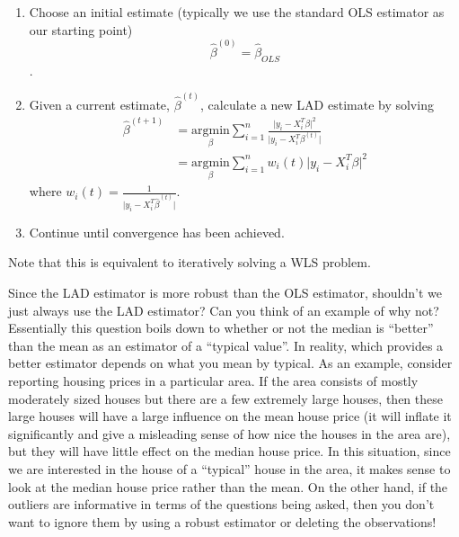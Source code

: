\begin{enumerate}
\item Choose an initial estimate (typically we use the standard OLS estimator as our starting point) $$\hat{\beta}^{(0)} = \hat{\beta}_{OLS}$$.
\item Given a current estimate, $\hat{\beta}^{(t)}$, calculate a new LAD estimate by solving
\begin{align*}
\hat{\beta}^{(t + 1)} & = \underset{\beta}{\text{argmin}} \sum_{i=1}^n \frac{\Big\vert y_i - X_i^T \beta \Big\vert^2}{\Big\vert y_i - X_i^T \beta^{(t)} \Big\vert}\\
& =  \underset{\beta}{\text{argmin}} \sum_{i=1}^n w_i(t) \Big\vert y_i - X_i^T \beta \Big\vert^2
\end{align*}
where $w_i(t) = \frac{1}{\Big\vert y_i - X_i^T \hat{\beta}^{(t)} \Big\vert}.$
\item Continue until convergence has been achieved.
\end{enumerate}

Note that this is equivalent to iteratively solving a WLS problem.



Since the LAD estimator is more robust than the OLS estimator, shouldn't we just always use the LAD estimator? Can you think of an example of why not? Essentially this question boils down to whether or not the median is ``better'' than the mean as an estimator of a ``typical value''. In reality, which provides a better estimator depends on what you mean by typical. As an example, consider reporting housing prices in a particular area. If the area consists of mostly moderately sized houses but there are a few extremely large houses, then these large houses will have a large influence on the mean house price (it will inflate it significantly and give a misleading sense of how nice the houses in the area are), but they will have little effect on the median house price. In this situation, since we are interested in the house of a ``typical'' house in the area, it makes sense to look at the median house price rather than the mean. On the other hand, if the outliers are informative in terms of the questions being asked, then you don't want to ignore them by using a robust estimator or deleting the observations! 

